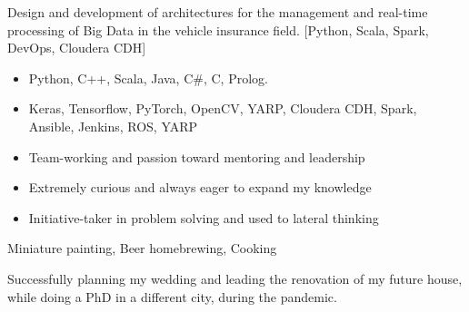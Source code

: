 \documentclass[10pt,a4paper,ragged2e]{altacv}
\begin{document}
\divider

Design and development of architectures for the management and real-time processing of Big Data in the vehicle insurance field. [Python, Scala, Spark, DevOps, Cloudera CDH]


\smallskip
\begin{itemize}
\item Python, C++, Scala, Java, C\#, C, Prolog.
\smallskip
\item Keras, Tensorflow, PyTorch, OpenCV, YARP, Cloudera CDH, Spark, Ansible, Jenkins, ROS, YARP
\smallskip
\end{itemize}
\smallskip
\begin{itemize}
\item Team-working and passion toward mentoring and leadership
\smallskip
\item Extremely curious and always eager to expand my knowledge
\smallskip
\item Initiative-taker in problem solving and used to lateral thinking
\end{itemize}

Miniature painting, Beer homebrewing, Cooking

\smallskip
Successfully planning my wedding and leading the renovation of my future house, while doing a PhD in a different city, during the pandemic.

\clearpage

\begin{fullwidth}

  
\printbibliography[heading=pubtype,title=\empty, type=misc]
  
  
\nocite{*}
  
\printbibliography[heading=pubtype,title={\printinfo{\faFileTextO}{Journal}}, type=article]
  
\divider 
  
\printbibliography[heading=pubtype,title={\printinfo{\faFileTextO}{Conference Proceedings}}, type=inproceedings]
  
\end{fullwidth}

\end{document}
